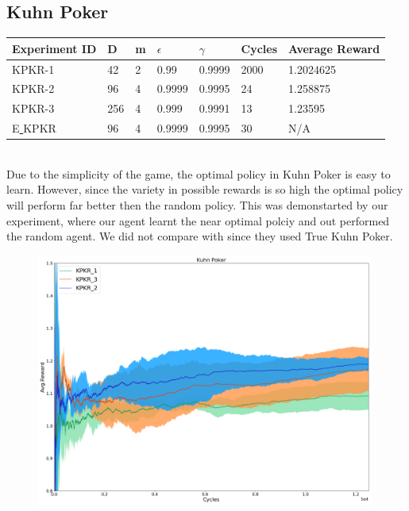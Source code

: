 \documentclass{article}
\theoremstyle{definition}
\newtheorem{primary statistics}[definition]{Primary Statistics}
\newtheorem{auxiliary statistics}[definition]{Auxiliary Statistics}
\begin{document}
\newpage

\subsection{Kuhn Poker}

\begin{tabular}{|l|l|l|l|l|l|l|}
\hline \centering 
  Experiment ID& D & m & $\epsilon$ & $\gamma$ & Cycles & Average Reward \\ \hline
KPKR-1  & 42        & 2           & 0.99        & 0.9999            & 2000   & 1.2024625        \\ \hline
KPKR-2  & 96        & 4           & 0.9999      & 0.9995            & 24     & 1.258875         \\ \hline
KPKR-3  & 256       & 4           & 0.999       & 0.9991            & 13     & 1.23595         \\ \hline
E\underline{ }KPKR  & 96       & 4           & 0.9999       & 0.9995            & 30     & N/A         \\ \hline
\end{tabular}  \\

Due to the simplicity of the game, the optimal policy in Kuhn Poker is easy to learn. However, since the variety in possible rewards is so high the optimal policy will perform far better then the random policy. This was demonstarted by our experiment, where our agent learnt the near optimal polciy and out performed the random agent. We did not compare with \cite{veness2011monte} since they used True Kuhn Poker.


 \begin{figure}[!htb]
 \centering
    \includegraphics[width=11.1cm]{4_Kuhn_Poker}
\end{figure}
\end{document}
